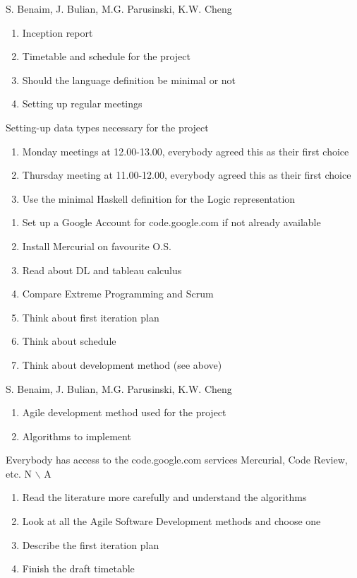 %
{S. Benaim, J. Bulian, M.G. Parusinski, K.W. Cheng}%
{ \begin{enumerate} \item Inception report
\item Timetable and schedule for the project
\item Should the language definition be minimal or not
\item Setting up regular meetings
\end{enumerate} }%
{Setting-up data types necessary for the project}%
{\begin{enumerate}
\item Monday meetings at 12.00-13.00, everybody agreed this as their first choice
\item Thursday meeting at 11.00-12.00, everybody agreed this as their first choice
\item Use the minimal Haskell definition for the Logic representation
\end{enumerate}}
{\begin{enumerate}
\item Set up a Google Account for code.google.com if not already available
\item Install Mercurial on favourite O.S.
\item Read about DL and tableau calculus
\item Compare Extreme Programming and Scrum
\item Think about first iteration plan
\item Think about schedule
\item Think about development method (see above)
\end{enumerate}}%

%
{S. Benaim, J. Bulian, M.G. Parusinski, K.W. Cheng}%
{ \begin{enumerate} 
\item Agile development method used for the project
\item Algorithms to implement
\end{enumerate} }%
{Everybody has access to the code.google.com services Mercurial, Code Review, etc.}%
{N $\backslash$ A}
{\begin{enumerate}
\item Read the literature more carefully and understand the algorithms
\item Look at all the Agile Software Development methods and choose one
\item Describe the first iteration plan
\item Finish the draft timetable
\end{enumerate}}%

